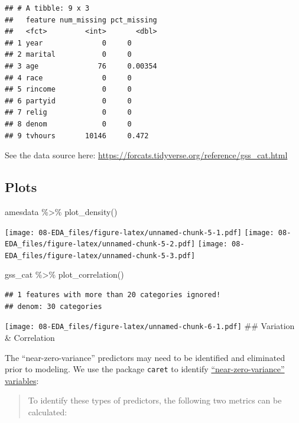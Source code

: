 \documentclass[
]{book}
\newenvironment{Shaded}{\begin{snugshade}}{\end{snugshade}}
\newcommand{\FunctionTok}[1]{\textcolor[rgb]{0.00,0.00,0.00}{#1}}
\newcommand{\NormalTok}[1]{#1}
\newcommand{\SpecialCharTok}[1]{\textcolor[rgb]{0.00,0.00,0.00}{#1}}
\begin{document}
\begin{verbatim}
## # A tibble: 9 x 3
##   feature num_missing pct_missing
##   <fct>         <int>       <dbl>
## 1 year              0     0      
## 2 marital           0     0      
## 3 age              76     0.00354
## 4 race              0     0      
## 5 rincome           0     0      
## 6 partyid           0     0      
## 7 relig             0     0      
## 8 denom             0     0      
## 9 tvhours       10146     0.472
\end{verbatim}

See the data source here: \url{https://forcats.tidyverse.org/reference/gss_cat.html}

\hypertarget{plots}{%
\subsection{Plots}\label{plots}}

\begin{Shaded}
\begin{Highlighting}[]
\NormalTok{amesdata  }\SpecialCharTok{\%\textgreater{}\%} \FunctionTok{plot\_density}\NormalTok{()}
\end{Highlighting}
\end{Shaded}

\texttt{[image: 08-EDA\_files/figure-latex/unnamed-chunk-5-1.pdf]} \texttt{[image: 08-EDA\_files/figure-latex/unnamed-chunk-5-2.pdf]} \texttt{[image: 08-EDA\_files/figure-latex/unnamed-chunk-5-3.pdf]}

\begin{Shaded}
\begin{Highlighting}[]
\NormalTok{gss\_cat  }\SpecialCharTok{\%\textgreater{}\%} \FunctionTok{plot\_correlation}\NormalTok{()}
\end{Highlighting}
\end{Shaded}

\begin{verbatim}
## 1 features with more than 20 categories ignored!
## denom: 30 categories
\end{verbatim}

\texttt{[image: 08-EDA\_files/figure-latex/unnamed-chunk-6-1.pdf]}
\#\# Variation \& Correlation

The ``near-zero-variance'' predictors may need to be identified and eliminated prior to modeling. We use the package \texttt{caret} to identify \href{https://topepo.github.io/caret/pre-processing.html}{``near-zero-variance'' variables}:

\begin{quote}
To identify these types of predictors, the following two metrics can be calculated:
\end{quote}
\end{document}
